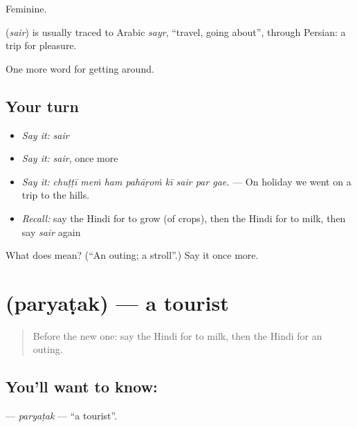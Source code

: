 Feminine.

\begin{cousinweb}
\textbf{} (\emph{sair}) is usually traced to Arabic \emph{sayr}, \textquotedblleft{}travel, going about\textquotedblright{}, through Persian: a trip for pleasure.
\end{cousinweb}

\begin{grammarlens}[title={What you've built}]
One more word for getting around.
\end{grammarlens}

\subsection*{Your turn}
\begin{itemize}
\raggedright
  \item \emph{Say it:} \emph{sair}
  \item \emph{Say it:} \emph{sair}, once more
  \item \emph{Say it:} \emph{chuṭṭī meṁ ham pahāṛoṁ kī sair par gae.} — On holiday we went on a trip to the hills.
  \item \emph{Recall:} say the Hindi for to grow (of crops), then the Hindi for to milk, then say \emph{sair} again
\end{itemize}

\begin{tcolorbox}[breakable,colback=teal!4,colframe=teal!35!black,title={Before you move on}]
What does  mean? (\textquotedblleft{}An outing; a stroll\textquotedblright{}.) Say it once more.
\end{tcolorbox}
\section[\texorpdfstring{\hi{पर्यटक} (paryaṭak)}{पर्यटक (paryaṭak)}]{ (paryaṭak) — a tourist}

\label{lesson:HI-C451-paryatak}



\begin{quote}
Before the new one: say the Hindi for to milk, then the Hindi for an outing.
\end{quote}

\subsection*{You'll want to know: }
\textbf{} — \emph{paryaṭak} — \textquotedblleft{}a tourist\textquotedblright{}.

